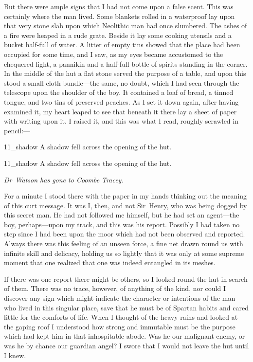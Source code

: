 But there were ample signs that I had not come upon a false scent. This was certainly where the man lived. Some blankets rolled in a waterproof lay upon that very stone slab upon which Neolithic man had once slumbered. The ashes of a fire were heaped in a rude grate. Beside it lay some cooking utensils and a bucket half-full of water. A litter of empty tins showed that the place had been occupied for some time, and I saw, as my eyes became accustomed to the chequered light, a pannikin and a half-full bottle of spirits standing in the corner. In the middle of the hut a flat stone served the purpose of a table, and upon this stood a small cloth bundle—the same, no doubt, which I had seen through the telescope upon the shoulder of the boy. It contained a loaf of bread, a tinned tongue, and two tins of preserved peaches. As I set it down again, after having examined it, my heart leaped to see that beneath it there lay a sheet of paper with writing upon it. I raised it, and this was what I read, roughly scrawled in pencil:— 

\begin{letter}
	\begin{bwbigpic}
			[1.0]  
		{11_shadow}
		{A shadow fell across the opening of the hut.}
	\end{bwbigpic}
\end{letter}
\begin{a4}
	\begin{bwbigpic}
			[1.0]  
		{11_shadow}
		{A shadow fell across the opening of the hut.}
	\end{bwbigpic}
\end{a4}



\textit{Dr~Watson has gone to Coombe Tracey.}

For a minute I stood there with the paper in my hands thinking out the meaning of this curt message. It was I, then, and not Sir~Henry, who was being dogged by this secret man. He had not followed me himself, but he had set an agent—the boy, perhaps—upon my track, and this was his report. Possibly I had taken no step since I had been upon the moor which had not been observed and reported. Always there was this feeling of an unseen force, a fine net drawn round us with infinite skill and delicacy, holding us so lightly that it was only at some supreme moment that one realized that one was indeed entangled in its meshes.

If there was one report there might be others, so I looked round the hut in search of them. There was no trace, however, of anything of the kind, nor could I discover any sign which might indicate the character or intentions of the man who lived in this singular place, save that he must be of Spartan habits and cared little for the comforts of life. When I thought of the heavy rains and looked at the gaping roof I understood how strong and immutable must be the purpose which had kept him in that inhospitable abode. Was he our malignant enemy, or was he by chance our guardian angel? I swore that I would not leave the hut until I knew.


